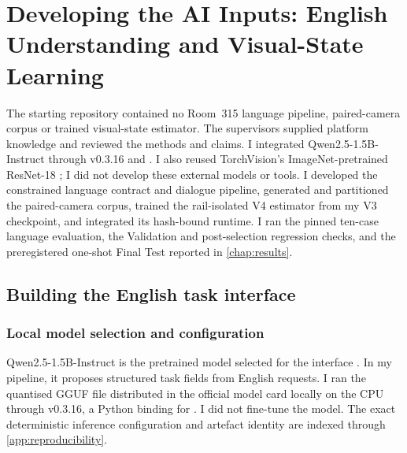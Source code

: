 \chapter[AI Inputs: English and Visual-State Learning]
{Developing the AI Inputs: English Understanding and Visual-State Learning}
\label{chap:ai-development}


\contributionboundary
  {The starting repository contained no Room~315 language pipeline,
  paired-camera corpus or trained visual-state estimator.}
  {The supervisors supplied platform knowledge and reviewed the methods and
  claims.}
  {I integrated Qwen2.5-1.5B-Instruct \citep{qwen25,qwen25gguf} through
   v0.3.16 and 
  \citep{llamacpppython,llamacpp}. I also reused TorchVision's
  ImageNet-pretrained ResNet-18
  \citep{torchvisionresnet18,resnet,imagenet}; I did not develop these external
  models or tools.}
  {I developed the constrained language contract and dialogue pipeline,
  generated and partitioned the paired-camera corpus, trained the rail-isolated
  V4 estimator from my V3 checkpoint, and integrated its hash-bound runtime.}
  {I ran the pinned ten-case language evaluation, the Validation and
  post-selection regression checks, and the preregistered one-shot Final Test
  reported in \cref{chap:results}.}

\section{Building the English task interface}

\subsection{Local model selection and configuration}

Qwen2.5-1.5B-Instruct is the pretrained model selected for the interface
\citep{qwen25}. In my pipeline, it proposes structured task fields from English
requests. I ran the quantised GGUF file distributed in the official model card
\citep{qwen25gguf} locally on the CPU through  v0.3.16,
a Python binding for  \citep{llamacpppython,llamacpp}. I did not
fine-tune the model. The exact deterministic inference configuration and
artefact identity are indexed through \cref{app:reproducibility}.

